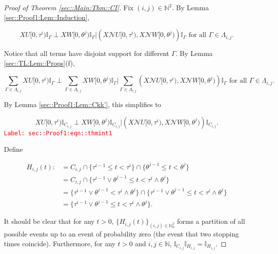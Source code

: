 \documentclass[12pt]{article}
\newcommand{\mb}{\mathbb}
\newcommand{\mc}{\mathcal}
\newcommand{\te}{\text}
\newcommand{\tr}{\textcolor{red}}
\newcommand{\labe}[1]{\tr{\texttt{Label: #1}}}
\newcommand{\neigh}{\mc{N}}					%
\renewcommand{\U}{U}							%
\newcommand{\UU}{W}								%
\renewcommand{\t}{t}							%
\newcommand{\X}{X}								%
\newcommand{\rt}[1]{\tau^{#1}}						%
\newcommand{\rtt}[1]{\theta^{#1}}					%
\newcommand{\itt}{i}								%
\newcommand{\ittt}{j}								%
\newcommand{\apath}{\Gamma}						%
\newcommand{\pathset}[2]{\Lambda_{#1,#2}}			%
\newcommand{\pathsete}[2]{C_{#1,#2}}			%
\newcommand{\pathseted}[2]{H_{#1,#2}}			%
\begin{document}
\begin{proof}[Proof of Theorem \ref{sec::Main:Thm::CI}]

Fix \((\itt,\ittt) \in \mb{N}^2\). By Lemma \ref{sec::Proof1:Lem::Induction}, 

\[\X{\U}{[0,\rt{\itt})}\mb{I}_{\apath}\perp \X{\UU}{[0,\rtt{\ittt})}\mb{I}_{\apath}\big|\left(\X{\neigh{\U}}{[0,\rt{\itt})},\X{\neigh{\UU}}{[0,\rtt{\ittt})}\right)\mb{I}_{\apath}\te{ for all }\apath \in \pathset{\itt}{\ittt}.\]

Notice that all terms have disjoint support for different \(\apath\). By Lemma \ref{sec::TL:Lem::Props}(f), 

\[\sum_{\apath\in\pathset{\itt}{\ittt}}\X{\U}{[0,\rt{\itt})}\mb{I}_{\apath}\perp \sum_{\apath\in\pathset{\itt}{\ittt}}\X{\UU}{[0,\rtt{\ittt})}\mb{I}_{\apath}\bigg|\sum_{\apath\in\pathset{\itt}{\ittt}}\left(\X{\neigh{\U}}{[0,\rt{\itt})},\X{\neigh{\UU}}{[0,\rtt{\ittt})}\right)\mb{I}_{\apath}\te{ for all }\apath \in \pathset{\itt}{\ittt}.\]

By Lemma \ref{sec::Proof1:Lem::Ckk'}, this simplifies to 

\begin{equation}
\X{\U}{[0,\rt{\itt})}\mb{I}_{\pathsete{\itt}{\ittt}}\perp \X{\UU}{[0,\rtt{\ittt})}\mb{I}_{\pathsete{\itt}{\ittt}}\big|\left(\X{\neigh{\U}}{[0,\rt{\itt})},\X{\neigh{\UU}}{[0,\rtt{\ittt})}\right)\mb{I}_{\pathsete{\itt}{\ittt}}.
\label{sec::Proof1:eqn::thmint1}
\end{equation}
\labe{sec::Proof1:eqn::thmint1}

Define

\begin{align*}
\pathseted{\itt}{\ittt}(\t) :&= \pathsete{\itt}{\ittt}\cap \{\rt{\itt-1}\leq \t < \rt{\itt}\}\cap \{\rtt{\ittt-1} \leq \t < \rtt{\ittt}\}\\
&=\pathsete{\itt}{\ittt}\cap\{\rt{\itt-1}\vee\rtt{\ittt-1} \leq \t < \rt{\itt}\wedge \rtt{\ittt}\}\\
&=\{\rt{\itt-1}\vee\rtt{\ittt-1}  < \rt{\itt}\wedge \rtt{\ittt}\} \cap \{\rt{\itt-1}\vee\rtt{\ittt-1} \leq \t < \rt{\itt}\wedge \rtt{\ittt}\}\\
&= \{\rt{\itt-1}\vee\rtt{\ittt-1} \leq \t < \rt{\itt}\wedge \rtt{\ittt}\}.
\end{align*}

It should be clear that for any \(\t > 0\), \(\{\pathseted{\itt}{\ittt}(\t)\}_{(\itt,\ittt)\in\mb{N}_0^2}\) forms a partition of all possible events up to an event of probability zero (the event that two stopping times coincide). Furthermore, for any \(t > 0\) and \(\itt,\ittt\in \mb{N}\), \(\mb{I}_{\pathsete{\itt}{\ittt}}\mb{I}_{\pathseted{\itt}{\ittt}} = \mb{I}_{\pathseted{\itt}{\ittt}}\).


\end{proof}
\end{document}
